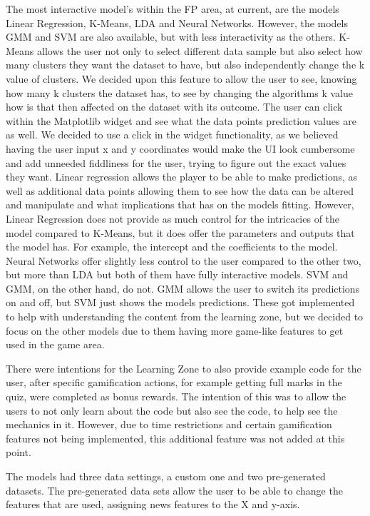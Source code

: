 	The most interactive model's within the FP area, at current, are the models Linear Regression, K-Means, LDA and Neural Networks. However, the models GMM and SVM are also available, but with less interactivity as the others. K-Means allows the user not only to select different data sample but also select how many clusters they want the dataset to have, but also independently change the k value of clusters. We decided upon this feature to allow the user to see, knowing how many k clusters the dataset has, to see by changing the algorithms k value how is that then affected on the dataset with its outcome. The user can click within the Matplotlib widget and see what the data points prediction values are as well. We decided to use a click in the widget functionality, as we believed having the user input x and y coordinates would make the UI look cumbersome and add unneeded fiddliness for the user, trying to figure out the exact values they want. Linear regression allows the player to be able to make predictions, as well as additional data points allowing them to see how the data can be altered and manipulate and what implications that has on the models fitting. However, Linear Regression does not provide as much control for the intricacies of the model compared to K-Means, but it does offer the parameters and outputs that the model has. For example, the intercept and the coefficients to the model. Neural Networks offer slightly less control to the user compared to the other two, but more than LDA but both of them have fully interactive models. SVM and GMM, on the other hand, do not. GMM allows the user to switch its predictions on and off, but SVM just shows the models predictions. These got implemented to help with understanding the content from the learning zone, but we decided to focus on the other models due to them having more game-like features to get used in the game area.
	
	There were intentions for the Learning Zone to also provide example code for the user, after specific gamification actions, for example getting full marks in the quiz, were completed as bonus rewards. The intention of this was to allow the users to not only learn about the code but also see the code, to help see the mechanics in it. However, due to time restrictions and certain gamification features not being implemented, this additional feature was not added at this point.
	
	The models had three data settings, a custom one and two pre-generated datasets. The pre-generated data sets allow the user to be able to change the features that are used, assigning news features to the X and y-axis.
	
